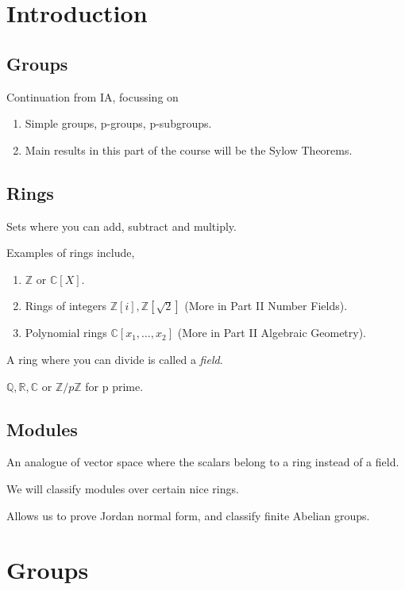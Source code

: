 \section*{Introduction}
\subsection*{Groups}
Continuation from IA, focussing on
\begin{enumerate}
    \item Simple groups, p-groups, p-subgroups.
    \item Main results in this part of the course will be the Sylow Theorems.
\end{enumerate}
\subsection*{Rings}
Sets where you can add, subtract and multiply.

\begin{example}
    Examples of rings include,
    \begin{enumerate}
        \item \(\mathbb{Z}\) or \(\mathbb{C}[X]\).
        \item Rings of integers \(\mathbb{Z}[i], \mathbb{Z}[\sqrt{2} ]\)  (More in Part II Number Fields).
        \item Polynomial rings \(\mathbb{C}[x_1, \ldots , x_2 ]\) (More in Part II Algebraic Geometry).
    \end{enumerate}
\end{example}

A ring where you can divide is called a \textit{field}.
\begin{example}
    \(\mathbb{Q},\mathbb{R},\mathbb{C}\) or \(\mathbb{Z} / p\mathbb{Z}\) for p prime.
\end{example}

\subsection*{Modules}
An analogue of vector space where the scalars belong to a ring instead of a field.

We will classify modules over certain nice rings.

Allows us to prove Jordan normal form, and classify finite Abelian groups.

\section{Groups}
